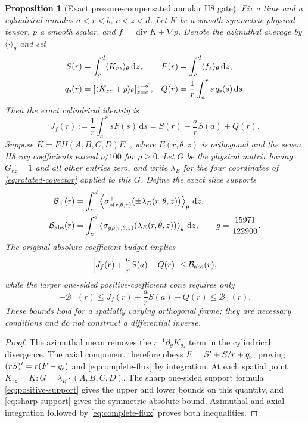 \documentclass[11pt,a4paper]{article}
\theoremstyle{plain}
\newtheorem{proposition}[theorem]{Proposition}
\theoremstyle{definition}
\newcommand{\diver}{\operatorname{div}}
\newcommand{\dd}{\,\mathrm{d}}
\begin{document}
\begin{proposition}[Exact pressure-compensated annular H8 gate]
\label{prop:complete-flux-gate}
Fix a time and a cylindrical annulus $a<r<b$, $c<z<d$.
Let $K$ be a smooth symmetric physical tensor, $p$ a smooth scalar,
and $f=\diver K+\nabla p$. Denote the azimuthal average by
$\langle\cdot\rangle_\theta$ and set
\begin{align}
 S(r)&=\int_c^d\langle K_{rz}\rangle_\theta\dd z, &
 F(r)&=\int_c^d\langle f_z\rangle_\theta\dd z,\notag\\
 q_{\rm s}(r)&=\left[\langle K_{zz}+p\rangle_\theta\right]_{z=c}^{z=d},&
 Q(r)&=\frac1r\int_a^r s\,q_{\rm s}(s)\dd s.\label{eq:complete-flux-data}
\end{align}
Then the exact cylindrical identity is
\begin{equation}\label{eq:complete-flux}
 J_f(r):=\frac1r\int_a^r sF(s)\dd s
 =S(r)-\frac arS(a)+Q(r).
\end{equation}
Suppose $K=EH(A,B,C,D)E^{\mathsf T}$, where $E(r,\theta,z)$ is
orthogonal and the seven H8 ray coefficients exceed $\rho/100$ for
$\rho\ge0$. Let $G$ be the physical matrix having $G_{rz}=1$
and all other entries zero, and write $\lambda_E$ for the four
coordinates of \eqref{eq:rotated-covector} applied to this $G$.
Define the exact slice supports
\begin{align}
 \mathcal B_\pm(r)&=\int_c^d\left\langle
  \sigma^+_{\rho(r,\theta,z)}(\pm\lambda_E(r,\theta,z))
  \right\rangle_\theta\dd z,\notag\\
 \mathcal B_{\rm abs}(r)&=\int_c^d\left\langle
 \sigma_{g\rho(r,\theta,z)}(\lambda_E(r,\theta,z))
 \right\rangle_\theta\dd z,
 \qquad g=\frac{15971}{122900}.\label{eq:complete-flux-supports}
\end{align}
The original absolute coefficient budget implies
\begin{equation}\label{eq:complete-flux-absolute}
 \left|J_f(r)+\frac arS(a)-Q(r)\right|
 \le\mathcal B_{\rm abs}(r),
\end{equation}
while the larger one-sided positive-coefficient cone requires only
\begin{equation}\label{eq:complete-flux-positive}
 -\mathcal B_-(r)\le J_f(r)+\frac arS(a)-Q(r)
 \le\mathcal B_+(r).
\end{equation}
These bounds hold for a spatially varying orthogonal frame; they
are necessary conditions and do not construct a differential inverse.
\end{proposition}

\begin{proof}
The azimuthal mean removes the $r^{-1}\partial_\theta K_{\theta z}$
term in the cylindrical divergence. The axial component therefore
obeys $F=S'+S/r+q_{\rm s}$, proving
$(rS)'=r(F-q_{\rm s})$ and \eqref{eq:complete-flux} by integration.
At each spatial point $K_{rz}=K:G=\lambda_E\cdot(A,B,C,D)$.
The sharp one-sided support formula \eqref{eq:positive-support}
gives the upper and lower bounds on this quantity, and
\eqref{eq:sharp-support} gives the symmetric absolute bound.
Azimuthal and axial integration followed by
\eqref{eq:complete-flux} proves both inequalities.
\end{proof}
\end{document}
